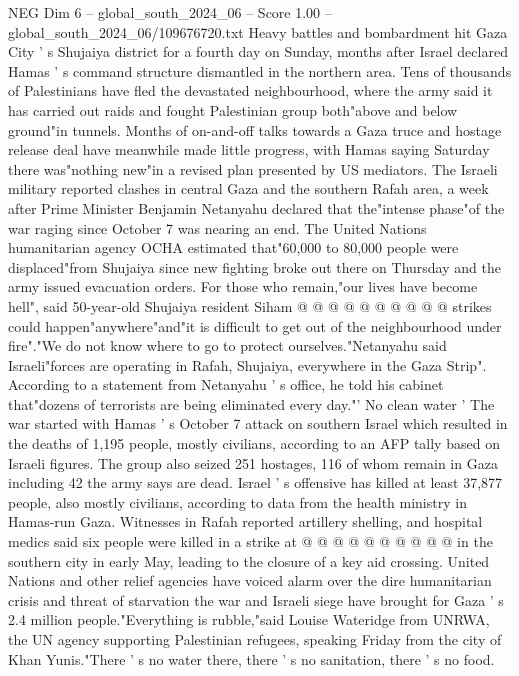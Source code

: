 \begin{textsample}{NEG Dim 6 – global\_south\_2024\_06 – Score 1.00 – global\_south\_2024\_06/109676720.txt}  \label{ex:f6_neg_267}
Heavy battles and bombardment hit Gaza City ' s Shujaiya district for a fourth day on Sunday, months after Israel declared Hamas ' s command structure dismantled in the northern area.
Tens of thousands of Palestinians have fled the devastated neighbourhood, where the army said it has carried out raids and fought Palestinian group both"above and below ground"in tunnels.
Months of on-and-off talks towards a Gaza truce and hostage release deal have meanwhile made little progress, with Hamas saying Saturday there was"nothing new"in a revised plan presented by US mediators.
The Israeli military reported clashes in central Gaza and the southern Rafah area, a week after Prime Minister Benjamin Netanyahu declared that the"intense phase"of the war raging since October 7 was nearing an end.
The United Nations humanitarian agency OCHA estimated that"60,000 to 80,000 people were displaced"from Shujaiya since new fighting broke out there on Thursday and the army issued evacuation orders.
For those who remain,"our lives have become hell", said 50-year-old Shujaiya resident Siham @ @ @ @ @ @ @ @ @ @ strikes could happen"anywhere"and"it is difficult to get out of the neighbourhood under fire"."We do not know where to go to protect ourselves."Netanyahu said Israeli"forces are operating in Rafah, Shujaiya, everywhere in the Gaza Strip".
According to a statement from Netanyahu ' s office, he told his cabinet that"dozens of terrorists are being eliminated every day."' No clean water ' The war started with Hamas ' s October 7 attack on southern Israel which resulted in the deaths of 1,195 people, mostly civilians, according to an AFP tally based on Israeli figures.
The group also seized 251 hostages, 116 of whom remain in Gaza including 42 the army says are dead.
Israel ' s offensive has killed at least 37,877 people, also mostly civilians, according to data from the health ministry in Hamas-run Gaza.
Witnesses in Rafah reported artillery shelling, and hospital medics said six people were killed in a strike at @ @ @ @ @ @ @ @ @ @ in the southern city in early May, leading to the closure of a key aid crossing.
United Nations and other relief agencies have voiced alarm over the dire humanitarian crisis and threat of starvation the war and Israeli siege have brought for Gaza ' s 2.4 million people."Everything is rubble,"said Louise Wateridge from UNRWA, the UN agency supporting Palestinian refugees, speaking Friday from the city of Khan Yunis."There ' s no water there, there ' s no sanitation, there ' s no food.

\end{textsample}

